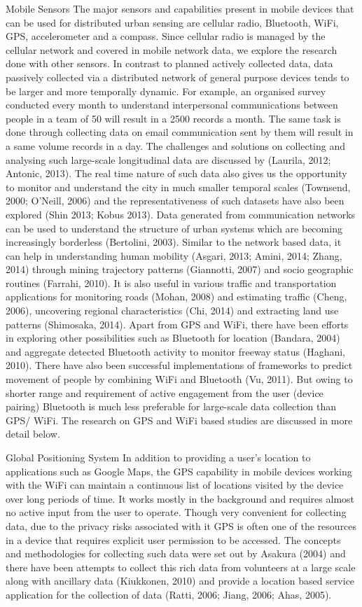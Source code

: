 Mobile Sensors The major sensors and capabilities present in mobile devices
that can be used for distributed urban sensing are cellular radio, Bluetooth,
WiFi, GPS, accelerometer and a compass. Since cellular radio is managed by the
cellular network and covered in mobile network data, we explore the research
done with other sensors. In contrast to planned actively collected data, data
passively collected via a distributed network of general purpose devices tends
to be larger and more temporally dynamic. For example, an organised survey
conducted every month to understand interpersonal communications between people
in a team of 50 will result in a 2500 records a month. The same task is done
through collecting data on email communication sent by them will result in a
same volume records in a day. The challenges and solutions on collecting and
analysing such large-scale longitudinal data are discussed by (Laurila, 2012;
Antonic, 2013). The real time nature of such data also gives us the opportunity
to monitor and understand the city in much smaller temporal scales (Townsend,
2000; O'Neill, 2006) and the representativeness of such datasets have also been
explored (Shin 2013; Kobus 2013). Data generated from communication networks can
be used to understand the structure of urban systems which are becoming
increasingly borderless (Bertolini, 2003). Similar to the network based data, it
can help in understanding human mobility (Asgari, 2013; Amini, 2014; Zhang,
2014) through mining trajectory patterns (Giannotti, 2007) and socio geographic
routines (Farrahi, 2010). It is also useful in various traffic and
transportation applications for monitoring roads (Mohan, 2008) and estimating
traffic (Cheng, 2006), uncovering regional characteristics (Chi, 2014) and
extracting land use patterns (Shimosaka, 2014). Apart from GPS and WiFi, there
have been efforts in exploring other possibilities such as Bluetooth for
location (Bandara, 2004) and aggregate detected Bluetooth activity to monitor
freeway status (Haghani, 2010). There have also been successful implementations
of frameworks to predict movement of people by combining WiFi and Bluetooth (Vu,
2011). But owing to shorter range and requirement of active engagement from the
user (device pairing) Bluetooth is much less preferable for large-scale data
collection than GPS/ WiFi. The research on GPS and WiFi based studies are
discussed in more detail below.


Global Positioning System In addition to providing a user’s location to
applications such as Google Maps, the GPS capability in mobile devices working
with the WiFi can maintain a continuous list of locations visited by the device
over long periods of time. It works mostly in the background and requires almost
no active input from the user to operate. Though very convenient for collecting
data, due to the privacy risks associated with it GPS is often one of the
resources in a device that requires explicit user permission to be accessed. The
concepts and methodologies for collecting such data were set out by Asakura
(2004) and there have been attempts to collect this rich data from volunteers at
a large scale along with ancillary data (Kiukkonen, 2010) and provide a location
based service application for the collection of data (Ratti, 2006; Jiang, 2006;
Ahas, 2005).  


